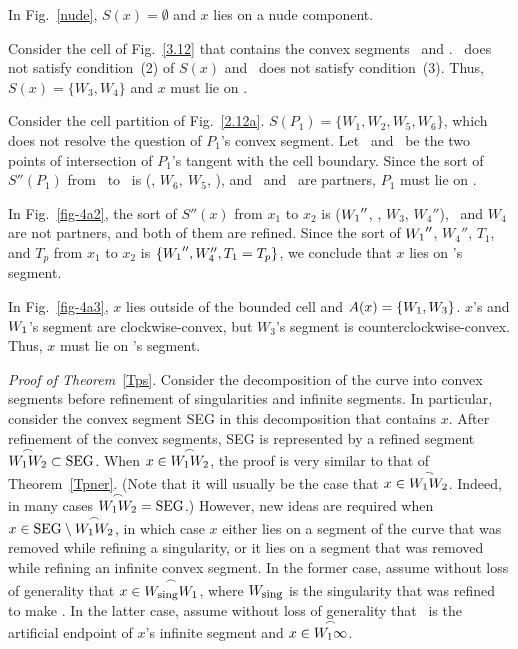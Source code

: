 \begin{example}
{\rm 
In Fig.~\ref{nude}, $S(x) = \emptyset$ and $x$ lies on a nude component.

Consider the cell of Fig.~\ref{3.12} that contains the convex segments 
\wwa\ and .
\wo\ does not satisfy condition~(2) of $S(x)$ and \wt\ does not satisfy condition~(3).
Thus, $S(x) = \{W_{3},W_{4}\}$ and $x$ must lie on .

Consider the cell partition of Fig.~\ref{2.12a}.
$S(P_{1}) = \{W_{1},W_{2},W_{5},W_{6}\}$, which does not resolve the question
of $P_{1}$'s convex segment.
Let \xo\ and \xt\ be the two points of intersection of $P_{1}$'s tangent
with the cell boundary.
Since the sort of $S''(P_{1})$ from \xo\ to \xt\ is (\wo, $W_{6},\ W_{5}$, \wt),
and \wo\ and \wt\ are partners, $P_{1}$ must lie on \wwa.

In Fig.~\ref{fig-4a2}, the sort of $S''(x)$ from $x_{1}$ to $x_{2}$ is ($\mbox{$W_{1}$}''$,
\wt, $W_{3}$, $W_{4}''$), \wo\ and $W_{4}$ are not partners,
and both of them are refined. 
Since the sort of $\mbox{$W_{1}$}''$, $W_{4}''$, $T_{1}$, and $T_{p}$ from $x_{1}$ to
$x_{2}$ is $\{\mbox{$W_{1}$}'',W_{4}'',T_{1} = T_{p}\}$, we conclude that $x$ lies on \wo's segment.

In Fig.~\ref{fig-4a3}, $x$ lies outside of the bounded cell and
$A(x) = \{\mbox{$W_{1}$},W_{3}\}$.
$x$'s and $\mbox{$W_{1}$}$'s segment are
clockwise-convex, but $W_{3}$'s segment is counterclockwise-convex.
Thus, $x$ must lie on \wo's segment.
}
\end{example}
%
\par{\it Proof of Theorem}~\ref{Tps}. \ignorespaces
Consider the decomposition of the curve into convex segments before refinement
of singularities and infinite segments.
In particular, consider the convex segment SEG in this decomposition that contains $x$.
After refinement of the convex segments, SEG is represented by a refined segment
$\mbox{$\stackrel{\frown}{\mbox{$W_{1}$}\mbox{$W_{2}$}}$} \subset \mbox{SEG}$.
When $x \in  \mbox{$\stackrel{\frown}{\mbox{$W_{1}$}\mbox{$W_{2}$}}$}$, the proof is very similar to that of Theorem~\ref{Tpner}.
(Note that it will usually be the case that $x \in  \mbox{$\stackrel{\frown}{\mbox{$W_{1}$}\mbox{$W_{2}$}}$}$.
Indeed, in many cases $\mbox{$\stackrel{\frown}{\mbox{$W_{1}$}\mbox{$W_{2}$}}$} = \mbox{SEG}$.)
However, new ideas are required when $x \in \mbox{SEG} \setminus \mbox{$\stackrel{\frown}{\mbox{$W_{1}$}\mbox{$W_{2}$}}$}$, 
in which case
$x$ either lies on a segment of the curve that was removed while refining a singularity,
or it lies on a segment that was removed while refining an infinite convex segment.
In the former case, 
assume without loss of generality that $x \in \mbox{$\stackrel{\frown}{W_{\mbox{\footnotesize{sing}}}\mbox{$W_{1}$}}$}$,
where $W_{\mbox{\footnotesize{sing}}}$ is the singularity that was refined to make \wo.
In the latter case, assume without loss of generality that \wo\ is the artificial endpoint
of $x$'s infinite segment and $x \in \mbox{$\stackrel{\frown}{\mbox{$W_{1}$}\infty}$}$.

